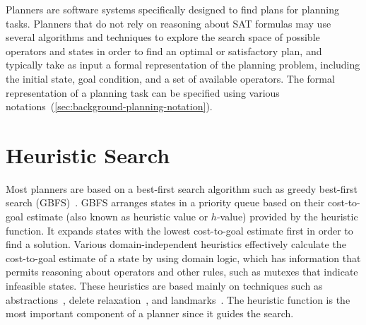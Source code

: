\documentclass[ppgc,diss,english]{iiufrgs}
\begin{document}
Planners are software systems specifically designed to find plans for planning tasks. Planners that do not rely on reasoning about SAT formulas may use several algorithms and techniques to explore the search space of possible operators and states in order to find an optimal or satisfactory plan, and typically take as input a formal representation of the planning problem, including the initial state, goal condition, and a set of available operators. The formal representation of a planning task can be specified using various notations~(\cref{sec:background-planning-notation}).

\section{Heuristic Search}
\label{sec:intro-heuristic-search}

Most planners are based on a best-first search algorithm such as greedy best-first search (GBFS)~\cite{Doran.Michie/1966}. GBFS arranges states in a priority queue based on their cost-to-goal estimate (also known as heuristic value or $h$-value) provided by the heuristic function. It expands states with the lowest cost-to-goal estimate first in order to find a solution. Various domain-independent heuristics effectively calculate the cost-to-goal estimate of a state by using domain logic, which has information that permits reasoning about operators and other rules, such as mutexes that indicate infeasible states. These heuristics are based mainly on techniques such as abstractions~\cite{Culberson.Schaeffer/1998}, delete relaxation~\cite{Hoffmann.Nebel/2001}, and landmarks~\cite{Hoffmann.etal/2004,Helmert.Domshlak/2009}. The heuristic function is the most important component of a planner since it guides the search.
\end{document}

